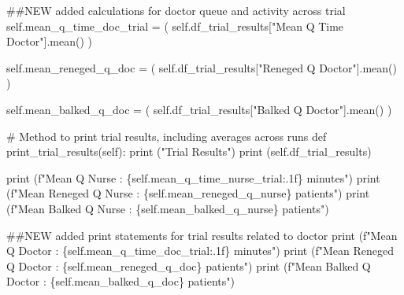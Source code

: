 \documentclass[
  letterpaper,
  DIV=11,
  numbers=noendperiod]{scrreprt}
\newenvironment{Shaded}{\begin{snugshade}}{\end{snugshade}}
\newcommand{\BuiltInTok}[1]{\textcolor[rgb]{0.00,0.23,0.31}{#1}}
\newcommand{\CommentTok}[1]{\textcolor[rgb]{0.37,0.37,0.37}{#1}}
\newcommand{\KeywordTok}[1]{\textcolor[rgb]{0.00,0.23,0.31}{#1}}
\newcommand{\NormalTok}[1]{\textcolor[rgb]{0.00,0.23,0.31}{#1}}
\newcommand{\OperatorTok}[1]{\textcolor[rgb]{0.37,0.37,0.37}{#1}}
\newcommand{\SpecialCharTok}[1]{\textcolor[rgb]{0.37,0.37,0.37}{#1}}
\newcommand{\SpecialStringTok}[1]{\textcolor[rgb]{0.13,0.47,0.30}{#1}}
\newcommand{\StringTok}[1]{\textcolor[rgb]{0.13,0.47,0.30}{#1}}
\newcommand{\VariableTok}[1]{\textcolor[rgb]{0.07,0.07,0.07}{#1}}
\begin{document}
\begin{tcolorbox}
\begin{Shaded}
\begin{Highlighting}[]
        \CommentTok{\#\#NEW added calculations for doctor queue and activity across trial}
        \VariableTok{self}\NormalTok{.mean\_q\_time\_doc\_trial }\OperatorTok{=}\NormalTok{ (}
            \VariableTok{self}\NormalTok{.df\_trial\_results[}\StringTok{"Mean Q Time Doctor"}\NormalTok{].mean()}
\NormalTok{        )}

        \VariableTok{self}\NormalTok{.mean\_reneged\_q\_doc }\OperatorTok{=}\NormalTok{ (}
            \VariableTok{self}\NormalTok{.df\_trial\_results[}\StringTok{"Reneged Q Doctor"}\NormalTok{].mean()}
\NormalTok{        )}

        \VariableTok{self}\NormalTok{.mean\_balked\_q\_doc }\OperatorTok{=}\NormalTok{ (}
            \VariableTok{self}\NormalTok{.df\_trial\_results[}\StringTok{"Balked Q Doctor"}\NormalTok{].mean()}
\NormalTok{        )}

    \CommentTok{\# Method to print trial results, including averages across runs}
    \KeywordTok{def}\NormalTok{ print\_trial\_results(}\VariableTok{self}\NormalTok{):}
        \BuiltInTok{print}\NormalTok{ (}\StringTok{"Trial Results"}\NormalTok{)}
        \BuiltInTok{print}\NormalTok{ (}\VariableTok{self}\NormalTok{.df\_trial\_results)}

        \BuiltInTok{print}\NormalTok{ (}\SpecialStringTok{f"Mean Q Nurse : }\SpecialCharTok{\{}\VariableTok{self}\SpecialCharTok{.}\NormalTok{mean\_q\_time\_nurse\_trial}\SpecialCharTok{:.1f\}}\SpecialStringTok{ minutes"}\NormalTok{)}
        \BuiltInTok{print}\NormalTok{ (}\SpecialStringTok{f"Mean Reneged Q Nurse : }\SpecialCharTok{\{}\VariableTok{self}\SpecialCharTok{.}\NormalTok{mean\_reneged\_q\_nurse}\SpecialCharTok{\}}\SpecialStringTok{ patients"}\NormalTok{)}
        \BuiltInTok{print}\NormalTok{ (}\SpecialStringTok{f"Mean Balked Q Nurse : }\SpecialCharTok{\{}\VariableTok{self}\SpecialCharTok{.}\NormalTok{mean\_balked\_q\_nurse}\SpecialCharTok{\}}\SpecialStringTok{ patients"}\NormalTok{)}

        \CommentTok{\#\#NEW added print statements for trial results related to doctor}
        \BuiltInTok{print}\NormalTok{ (}\SpecialStringTok{f"Mean Q Doctor : }\SpecialCharTok{\{}\VariableTok{self}\SpecialCharTok{.}\NormalTok{mean\_q\_time\_doc\_trial}\SpecialCharTok{:.1f\}}\SpecialStringTok{ minutes"}\NormalTok{)}
        \BuiltInTok{print}\NormalTok{ (}\SpecialStringTok{f"Mean Reneged Q Doctor : }\SpecialCharTok{\{}\VariableTok{self}\SpecialCharTok{.}\NormalTok{mean\_reneged\_q\_doc}\SpecialCharTok{\}}\SpecialStringTok{ patients"}\NormalTok{)}
        \BuiltInTok{print}\NormalTok{ (}\SpecialStringTok{f"Mean Balked Q Doctor : }\SpecialCharTok{\{}\VariableTok{self}\SpecialCharTok{.}\NormalTok{mean\_balked\_q\_doc}\SpecialCharTok{\}}\SpecialStringTok{ patients"}\NormalTok{)}


\end{Highlighting}
\end{Shaded}
\end{tcolorbox}
\end{document}
